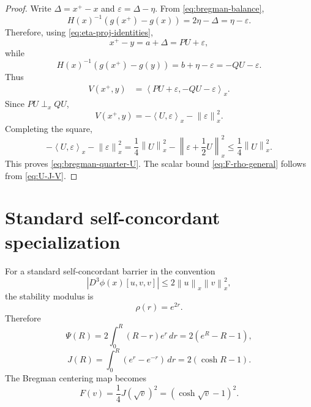 \documentclass[11pt]{article}
\newcommand{\ip}[2]{\left\langle #1,#2\right\rangle}
\newcommand{\norm}[1]{\left\|#1\right\|}
\begin{document}
\begin{proof}
Write $\Delta=x^+-x$ and $\varepsilon=\Delta-\eta$.  From \eqref{eq:bregman-balance},
\[
  H(x)^{-1}(g(x^+)-g(x))=2\eta-\Delta=\eta-\varepsilon.
\]
Therefore, using \eqref{eq:eta-proj-identities},
\[
  x^+-y=a+\Delta=PU+\varepsilon,
\]
while
\[
  H(x)^{-1}(g(x^+)-g(y))=b+\eta-\varepsilon=-QU-\varepsilon.
\]
Thus
\begin{align*}
  V(x^+,y)
  &=\ip{PU+\varepsilon}{-QU-\varepsilon}_x.
\end{align*}
Since $PU\perp_x QU$,
\[
  V(x^+,y)=-\ip{U}{\varepsilon}_x-\norm{\varepsilon}_x^2.
\]
Completing the square,
\[
  -\ip{U}{\varepsilon}_x-\norm{\varepsilon}_x^2
  =\frac14\norm{U}_x^2-\norm{\varepsilon+\frac12U}_x^2
  \le \frac14\norm{U}_x^2.
\]
This proves \eqref{eq:bregman-quarter-U}.  The scalar bound \eqref{eq:F-rho-general} follows from \eqref{eq:U-J-V}.
\end{proof}

\section{Standard self-concordant specialization}

For a standard self-concordant barrier in the convention
\[
  |D^3\phi(x)[u,v,v]|\le 2\norm{u}_x\norm{v}_x^2,
\]
the stability modulus is
\begin{equation}
  \rho(r)=e^{2r}.                                      \label{eq:rho-sc}
\end{equation}
Therefore
\begin{equation}
  \Psi(R)=2\int_0^R (R-r)e^r\,dr=2(e^R-R-1),            \label{eq:Psi-sc}
\end{equation}
\begin{equation}
  J(R)=\int_0^R(e^r-e^{-r})\,dr=2(\cosh R-1).            \label{eq:J-sc}
\end{equation}
The Bregman centering map becomes
\begin{equation}
  F(v)=\frac14J(\sqrt v)^2=(\cosh\sqrt v-1)^2.           \label{eq:F-sc}
\end{equation}
\end{document}
